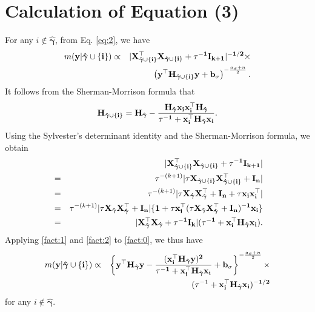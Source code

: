 \documentclass[twocolumn]{svjour3}       %
\newcommand{\T}{\top} %
\newcommand{\uI}{\bf I} %
\newcommand{\uH}{\bf H} %
\newcommand{\uX}{\bf X} %
\newcommand{\ux}{\bf x} %
\newcommand{\uy}{\bf y} %
\newcommand{\0}{\boldsymbol 0} %
\newcommand{\1}{\boldsymbol 1} %
\newcommand{\bg}{\boldsymbol \gamma} %
\begin{document}
{\section{Calculation of Equation (3)}\label{app:1}
For any $i \notin \hat{\bg}$, from Eq. \eqref{eq:2}, we have
\begin{eqnarray} \label{fact:0}
m(\uy|\hat{\bg}\cup\{i\})&\propto& |\uX_{\hat{\bg}\cup\{i\} }^{\T}\uX_{\hat{\bg}\cup\{i\} }+\tau^{-1}\uI_{k+1} |^{-1/2}\times\nonumber\\
&&\left(\uy^{\T}\uH_{\hat{\bg}\cup\{i\}} \uy+b_{\sigma}\right)^{-\frac{a_{\sigma}+n}{2} }.
\end{eqnarray}
It follows from the Sherman-Morrison formula that
\begin{eqnarray}\label{fact:1}
\uH_{\hat{\bg}\cup\{i\} }= \uH_{\hat{\bg}}-\frac{\uH_{\hat{\bg}}\ux_i \ux_i
  ^{\T}\uH_{\hat{\bg}} } {\tau^{-1}+\ux_i^{\T}\uH_{\hat{\bg}}\ux_i}.
\end{eqnarray}
Using the Sylvester's determinant identity and the Sherman-Morrison formula, we obtain 
\begin{eqnarray}\label{fact:2}
&&|\uX_{\hat{\bg}\cup\{i\} }^{\T}\uX_{\hat{\bg}\cup\{i\} }+\tau^{-1}\uI_{k+1}   |\\
 &=& \tau^{-(k+1)}|\tau \uX_{\hat{\bg}\cup\{i\} }\uX_{\hat{\bg}\cup\{i\} }^{\T}+\uI_n |\nonumber\\
  &=& \tau^{-(k+1)}|\tau \uX_{\hat{\bg}}\uX_{\hat{\bg}}^{\T}+\uI_n+\tau \ux_i \ux_i^{\T} |\nonumber\\
  &=&  \tau^{-(k+1)} |\tau \uX_{\hat{\bg}}\uX_{\hat{\bg}}^{\T}+\uI_n| \{1+ \tau \ux_i^{\T}
  (\tau \uX_{\hat{\bg}}\uX_{\hat{\bg}}^{\T}+\uI_n)^{-1}\ux_i\}\nonumber\\
  &=&| \uX_{\hat{\bg}}^{\T}\uX_{\hat{\bg}}+\tau^{-1}\uI_{k}| (\tau^{-1}+\ux_i^{\T}\uH_{\hat{\bg}} \ux_i).
\end{eqnarray}
Applying \eqref{fact:1} and \eqref{fact:2} to \eqref{fact:0}, we thus have
\begin{eqnarray*}
 m(\uy|\hat{\bg}\cup\{i\}) &\propto& \left\{\uy^{\T}\uH_{\hat{\bg}}\uy-\frac{(
  \ux_i^{\T}\uH_{\hat{\bg}}\uy)^2}{\tau^{-1}+\ux_i^{\T}\uH_{\hat{\bg}} \ux_i }+b_{\sigma}\right\}^{-\frac{a_{\sigma}+n}{2}}\times\\
 &&(\tau^{-1}+\ux_i^{\T}\uH_{\hat{\bg}} \ux_i)^{-1/2}
\end{eqnarray*}
for any $i \notin \hat{\bg}$. 

}
\end{document}
